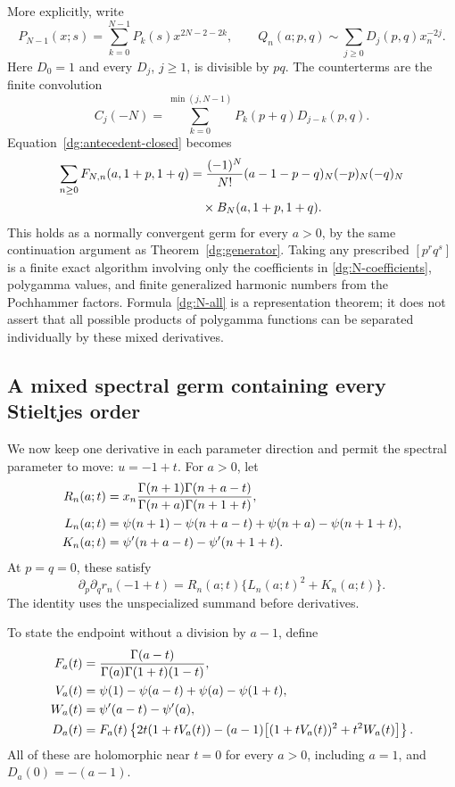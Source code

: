 \documentclass[11pt,a4paper]{article}
\numberwithin{equation}{section}
\theoremstyle{definition}
\theoremstyle{remark}
\begin{document}
More explicitly, write
\[
 P_{N-1}(x;s)=\sum_{k=0}^{N-1}P_k(s)x^{2N-2-2k},\qquad
 Q_n(a;p,q)\sim\sum_{j\geq0}D_j(p,q)x_n^{-2j}.
\]
Here $D_0=1$ and every $D_j$, $j\geq1$, is divisible by $pq$.
The counterterms are the finite convolution
\begin{equation}
 C_j(-N)=\sum_{k=0}^{\min(j,N-1)}P_k(p+q)D_{j-k}(p,q).
 \label{dg:N-coefficients}
\end{equation}
Equation~\eqref{dg:antecedent-closed} becomes
\begin{align}
 \sum_{n\geq0}F_{N,n}(a,1+p,1+q)
 &=\frac{(-1)^N}{N!}(a-1-p-q)_N(-p)_N(-q)_N\notag\\
 &\quad\times B_N(a,1+p,1+q).
 \label{dg:N-all}
\end{align}
This holds as a normally convergent germ for every $a>0$, by the
same continuation argument as Theorem~\ref{dg:generator}.
Taking any prescribed $[p^rq^s]$ is a finite exact algorithm involving
only the coefficients in \eqref{dg:N-coefficients}, polygamma
values, and finite generalized harmonic numbers from the Pochhammer
factors. Formula \eqref{dg:N-all} is a representation theorem;
it does not assert that all possible products of polygamma functions
can be separated individually by these mixed derivatives.

\subsection{A mixed spectral germ containing every Stieltjes order}

We now keep one derivative in each parameter direction and permit
the spectral parameter to move: $u=-1+t$. For $a>0$, let
\begin{align}
 R_n(a;t)&=x_n\frac{\Gamma(n+1)\Gamma(n+a-t)}
                       {\Gamma(n+a)\Gamma(n+1+t)},\notag\\
 L_n(a;t)&=\psi(n+1)-\psi(n+a-t)+\psi(n+a)-\psi(n+1+t),\notag\\
 K_n(a;t)&=\psi'(n+a-t)-\psi'(n+1+t).
 \label{dg:spectral-summands}
\end{align}
At $p=q=0$, these satisfy
\[
 \partial_p\partial_q r_n(-1+t)
                 =R_n(a;t)\{L_n(a;t)^2+K_n(a;t)\}.
\]
The identity uses the unspecialized summand before derivatives.

To state the endpoint without a division by $a-1$, define
\begin{align}
 F_a(t)&=\frac{\Gamma(a-t)}{\Gamma(a)\Gamma(1+t)(1-t)},\notag\\
 V_a(t)&=\psi(1)-\psi(a-t)+\psi(a)-\psi(1+t),\notag\\
 W_a(t)&=\psi'(a-t)-\psi'(a),\notag\\
 D_a(t)&=F_a(t)\left\{2t(1+tV_a(t))
 -(a-1)\bigl[(1+tV_a(t))^2+t^2W_a(t)\bigr]\right\}.
 \label{dg:D}
\end{align}
All of these are holomorphic near $t=0$ for every $a>0$, including
$a=1$, and $D_a(0)=-(a-1)$.
\end{document}
